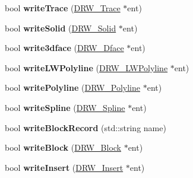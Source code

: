 \begin{DoxyCompactItemize}
\item 
\hypertarget{classdxfRW_a6b3c9c69c2e2a52a0e7e76981b4453e7}{bool {\bfseries write\-Trace} (\hyperlink{classDRW__Trace}{D\-R\-W\-\_\-\-Trace} $\ast$ent)}\label{classdxfRW_a6b3c9c69c2e2a52a0e7e76981b4453e7}

\item 
\hypertarget{classdxfRW_a8442bca4e8de46f9b72cc91b92d8ae72}{bool {\bfseries write\-Solid} (\hyperlink{classDRW__Solid}{D\-R\-W\-\_\-\-Solid} $\ast$ent)}\label{classdxfRW_a8442bca4e8de46f9b72cc91b92d8ae72}

\item 
\hypertarget{classdxfRW_a8bbb73ad9eba364aea9f8725ac9a4a7b}{bool {\bfseries write3dface} (\hyperlink{classDRW__3Dface}{D\-R\-W\-\_\-Dface} $\ast$ent)}\label{classdxfRW_a8bbb73ad9eba364aea9f8725ac9a4a7b}

\item 
\hypertarget{classdxfRW_a5bbb5e97e08dc70e84e1deab5e5d0df1}{bool {\bfseries write\-L\-W\-Polyline} (\hyperlink{classDRW__LWPolyline}{D\-R\-W\-\_\-\-L\-W\-Polyline} $\ast$ent)}\label{classdxfRW_a5bbb5e97e08dc70e84e1deab5e5d0df1}

\item 
\hypertarget{classdxfRW_acb6a0166ab6a04c6de90bcec0e76629d}{bool {\bfseries write\-Polyline} (\hyperlink{classDRW__Polyline}{D\-R\-W\-\_\-\-Polyline} $\ast$ent)}\label{classdxfRW_acb6a0166ab6a04c6de90bcec0e76629d}

\item 
\hypertarget{classdxfRW_a36915a0c8583995677ebb935fe295f19}{bool {\bfseries write\-Spline} (\hyperlink{classDRW__Spline}{D\-R\-W\-\_\-\-Spline} $\ast$ent)}\label{classdxfRW_a36915a0c8583995677ebb935fe295f19}

\item 
\hypertarget{classdxfRW_ae2e7942bd2a46ec1588940e593790a21}{bool {\bfseries write\-Block\-Record} (std\-::string name)}\label{classdxfRW_ae2e7942bd2a46ec1588940e593790a21}

\item 
\hypertarget{classdxfRW_a2fc8f35a6e632bb55217d4eac802bee0}{bool {\bfseries write\-Block} (\hyperlink{classDRW__Block}{D\-R\-W\-\_\-\-Block} $\ast$ent)}\label{classdxfRW_a2fc8f35a6e632bb55217d4eac802bee0}

\item 
\hypertarget{classdxfRW_acf817c40ca21404ec4bb1663b261702a}{bool {\bfseries write\-Insert} (\hyperlink{classDRW__Insert}{D\-R\-W\-\_\-\-Insert} $\ast$ent)}\label{classdxfRW_acf817c40ca21404ec4bb1663b261702a}


\end{DoxyCompactItemize}
